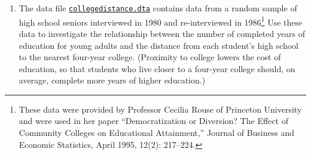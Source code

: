\documentclass[11pt]{article}
\begin{document}
\begin{enumerate}
\def\labelenumi{\arabic{enumi}.}
\setcounter{enumi}{3}
\item
  The data file
  \href{../collegedistance.dta}{\texttt{collegedistance.dta}} contains
  data from a random sample of high school seniors interviewed in 1980
  and re-interviewed in 1986\footnote{These data were provided by
    Professor Cecilia Rouse of Princeton University and were used in her
    paper ``Democratization or Diversion? The Effect of Community
    Colleges on Educational Attainment,'' Journal of Business and
    Economic Statistics, April 1995, 12(2): 217--224.} Use these data to
  investigate the relationship between the number of completed years of
  education for young adults and the distance from each student's high
  school to the nearest four-year college. (Proximity to college lowers
  the cost of education, so that students who live closer to a four-year
  college should, on average, complete more years of higher education.)



\end{enumerate}
\end{document}
